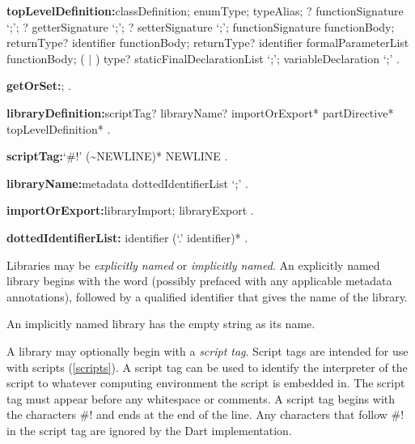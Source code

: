 \documentclass{article}
\begin{document}
\begin{grammar}
{\bf topLevelDefinition:}classDefinition;
  enumType;
  typeAlias;
  \EXTERNAL{}? functionSignature `{\escapegrammar ;}';
  \EXTERNAL{}? getterSignature `{\escapegrammar ;}';
  \EXTERNAL{}? setterSignature `{\escapegrammar ;}';
  functionSignature functionBody;
  returnType? \GET{} identifier functionBody;
  returnType? \SET{} identifier formalParameterList functionBody;
  (\FINAL{} $|$ \CONST{}) type? staticFinalDeclarationList `{\escapegrammar ;}';
  variableDeclaration `{\escapegrammar ;}'
  .

{\bf getOrSet:}\GET{};
  \SET{}
  .

{\bf libraryDefinition:}scriptTag? libraryName? importOrExport* partDirective*
  \gnewline{} topLevelDefinition*
  .

{\bf scriptTag:}`\#!' {\escapegrammar (\~{}NEWLINE)*} NEWLINE
  .

{\bf libraryName:}metadata \LIBRARY{} dottedIdentifierList `{\escapegrammar ;}'
  .

{\bf importOrExport:}libraryImport;
  libraryExport
  .

{\bf dottedIdentifierList:} identifier (`{\escapegrammar .}' identifier)*
  .
\end{grammar}

\LMHash{}
Libraries may be {\em explicitly named} or {\em implicitly named}.
An explicitly named library begins with the word \LIBRARY{} (possibly prefaced with any applicable metadata annotations), followed by a qualified identifier that gives the name of the library.


\LMHash{}
An implicitly named library has the empty string as its name.



\LMHash{}
A library may optionally begin with a {\em script tag}.
Script tags are intended for use with scripts (\ref{scripts}).
A script tag can be used to identify the interpreter of the script to whatever computing environment the script is embedded in.
The script tag must appear before any whitespace or comments.
A script tag begins with the characters \#! and ends at the end of the line.
Any characters that follow \#! in the script tag are ignored by the Dart implementation.
\end{document}
